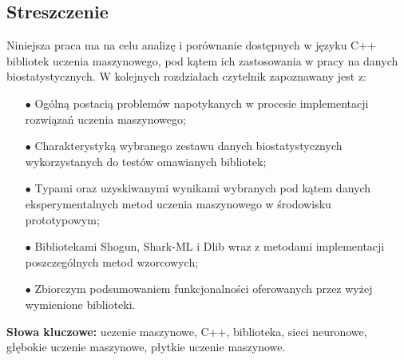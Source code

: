 
\subsection*{Streszczenie}

    Niniejsza praca ma na celu analizę i porównanie dostępnych w języku C++ bibliotek uczenia maszynowego, pod kątem ich zastosowania w pracy na danych biostatystycznych. W kolejnych rozdziałach czytelnik zapoznawany jest z:
    
    \begin{itemize}
    	\item [$\bullet$] Ogólną postacią problemów napotykanych w procesie implementacji rozwiązań uczenia maszynowego;
    	\item [$\bullet$] Charakterystyką wybranego zestawu danych biostatystycznych wykorzystanych do testów omawianych bibliotek;
    	\item [$\bullet$] Typami oraz uzyskiwanymi wynikami wybranych pod kątem danych eksperymentalnych metod uczenia maszynowego w środowisku prototypowym;
    	\item [$\bullet$] Bibliotekami Shogun, Shark-ML i Dlib wraz z metodami implementacji poszczególnych metod wzorcowych;
    	\item [$\bullet$] Zbiorczym podsumowaniem funkcjonalności oferowanych przez wyżej wymienione biblioteki.
    \end{itemize}

	

\vspace{1cm}
\noindent\textbf{Słowa kluczowe:} uczenie maszynowe, C++, biblioteka, sieci neuronowe, głębokie uczenie maszynowe, płytkie uczenie maszynowe.
